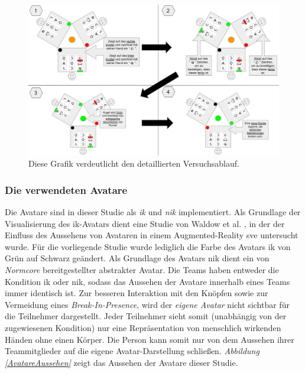 \documentclass[a4paper,11pt]{article}%
\renewcommand{\\}{\vspace*{0.5\baselineskip} \newline}
\begin{document}
	\begin{figure}[h]
		\begin{footnotesize}
		\centering
			\includegraphics[scale=0.30]{Abbildungen/DetaillierterVersuchsablauf.JPG}		
			\caption[Darstellung des Versuchsablaufs]{Diese Grafik verdeutlicht den detaillierten Versuchsablauf.}
			\label{DetaillierterVersuchsablauf}
		\end{footnotesize}
	\end{figure}

	\subsubsection{Die verwendeten Avatare}
\label{IKNIK}
Die Avatare sind in dieser Studie als \textit{\ac{ik}} und \textit{\ac{nik}} implementiert. Als Grundlage der Visualisierung des \ac{ik}-Avatars dient eine Studie von Waldow et al. \citep{waldow2019investigating}, in der der Einfluss des Aussehens von Avataren in einem Augmented-Reality \ac{sve} untersucht wurde. Für die vorliegende Studie wurde lediglich die Farbe des Avatars \ac{ik} von Grün auf Schwarz geändert. 
Als Grundlage des Avatars \ac{nik} dient ein von \textit{Normcore} bereitgestellter abstrakter Avatar.
Die Teams haben entweder die Kondition \newline \ac{ik} oder \ac{nik}, sodass das Aussehen der Avatare innerhalb eines Teams immer identisch ist. Zur besseren Interaktion mit den Knöpfen sowie zur Vermeidung eines \textit{Break-In-Presence}, wird der \textit{eigene Avatar} nicht sichtbar für die Teilnehmer dargestellt. Jeder Teilnehmer sieht somit (unabhängig von der zugewiesenen Kondition) nur eine Repräsentation von menschlich wirkenden Händen ohne einen Körper. Die Person kann somit nur von dem Aussehen ihrer Teammitglieder auf die eigene Avatar-Darstellung schließen. \textit{Abbildung \ref{AvatareAussehen}} zeigt das Aussehen der Avatare dieser Studie.
\end{document}
